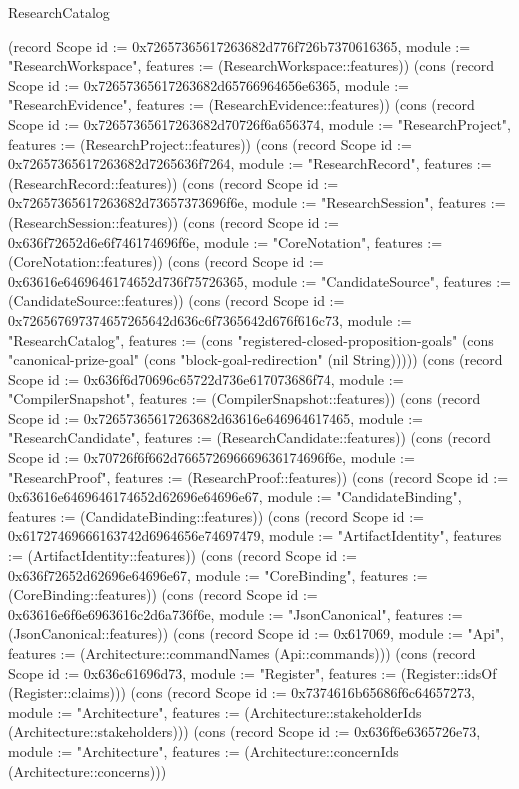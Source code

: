 \begin{lexlean}{ResearchCatalog}
\begin{semanticmodule}
{(record Scope {id := 0x72657365617263682d776f726b7370616365, module := "ResearchWorkspace", features := (ResearchWorkspace::features)}) (cons (record Scope {id := 0x72657365617263682d65766964656e6365, module := "ResearchEvidence", features := (ResearchEvidence::features)}) (cons (record Scope {id := 0x72657365617263682d70726f6a656374, module := "ResearchProject", features := (ResearchProject::features)}) (cons (record Scope {id := 0x72657365617263682d7265636f7264, module := "ResearchRecord", features := (ResearchRecord::features)}) (cons (record Scope {id := 0x72657365617263682d73657373696f6e, module := "ResearchSession", features := (ResearchSession::features)}) (cons (record Scope {id := 0x636f72652d6e6f746174696f6e, module := "CoreNotation", features := (CoreNotation::features)}) (cons (record Scope {id := 0x63616e6469646174652d736f75726365, module := "CandidateSource", features := (CandidateSource::features)}) (cons (record Scope {id := 0x726567697374657265642d636c6f7365642d676f616c73, module := "ResearchCatalog", features := (cons "registered-closed-proposition-goals" (cons "canonical-prize-goal" (cons "block-goal-redirection" (nil String))))}) (cons (record Scope {id := 0x636f6d70696c65722d736e617073686f74, module := "CompilerSnapshot", features := (CompilerSnapshot::features)}) (cons (record Scope {id := 0x72657365617263682d63616e646964617465, module := "ResearchCandidate", features := (ResearchCandidate::features)}) (cons (record Scope {id := 0x70726f6f662d766572696669636174696f6e, module := "ResearchProof", features := (ResearchProof::features)}) (cons (record Scope {id := 0x63616e6469646174652d62696e64696e67, module := "CandidateBinding", features := (CandidateBinding::features)}) (cons (record Scope {id := 0x61727469666163742d6964656e74697479, module := "ArtifactIdentity", features := (ArtifactIdentity::features)}) (cons (record Scope {id := 0x636f72652d62696e64696e67, module := "CoreBinding", features := (CoreBinding::features)}) (cons (record Scope {id := 0x63616e6f6e6963616c2d6a736f6e, module := "JsonCanonical", features := (JsonCanonical::features)}) (cons (record Scope {id := 0x617069, module := "Api", features := (Architecture::commandNames (Api::commands))})
    (cons (record Scope {id := 0x636c61696d73, module := "Register", features := (Register::idsOf (Register::claims))})
    (cons (record Scope {id := 0x7374616b65686f6c64657273, module := "Architecture", features := (Architecture::stakeholderIds (Architecture::stakeholders))})
    (cons (record Scope {id := 0x636f6e6365726e73, module := "Architecture", features := (Architecture::concernIds (Architecture::concerns))})
}
\end{semanticmodule}
\end{lexlean}
